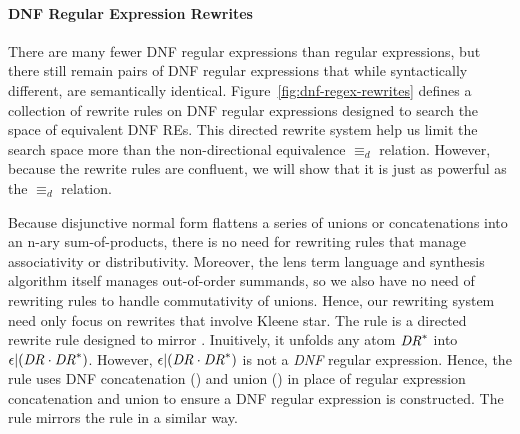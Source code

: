 \documentclass[numbers,10pt,preprint\ifanon ,nocopyrightspace\fi]{sigplanconf}
\begin{document}
\paragraph*{DNF Regular Expression Rewrites}

There are many fewer DNF regular expressions than regular expressions, but there
still remain pairs of DNF regular expressions that while syntactically different,
are semantically identical.  
Figure~\ref{fig:dnf-regex-rewrites} defines a collection of rewrite rules on DNF regular expressions
designed to search the space of equivalent DNF REs.  
This directed rewrite system help us limit
the search space more than the non-directional equivalence $\equiv_d$ relation.
However, because the rewrite rules are confluent, we will show that it is just as powerful as the
$\equiv_d$ relation.
 

Because disjunctive normal form flattens a series of unions or concatenations
into an n-ary sum-of-products,
there is no need for rewriting rules that manage associativity or
distributivity.  Moreover, the lens term language and synthesis algorithm itself manages out-of-order summands, so we also have no need of rewriting
rules to handle commutativity of unions.  Hence, our rewriting system
need only focus on rewrites that involve Kleene star.
The rule \AtomUnrollstarLeftRule{} is a directed rewrite rule
designed to mirror \UnrollstarLeftRule{}.  Inuitively, it unfolds any atom 
${\mathit{DR}{}}^*$ into $\epsilon{}|(\mathit{DR}{}\cdot{{\ensuremath{\mathit{DR}}{}}}^*)$.  However, 
$\epsilon{}|(\mathit{DR}{}\cdot{{\ensuremath{\mathit{DR}}{}}}^*)$ is
not a \emph{DNF} regular expression.  Hence, the rule uses DNF concatenation (\ConcatDNF)
and union (\OrDNF) in place of regular expression concatenation and union
to ensure a DNF regular expression is constructed.  The rule
\AtomUnrollstarRightRule{} mirrors the rule \UnrollstarRightRule{} in 
a similar way.
\end{document}
